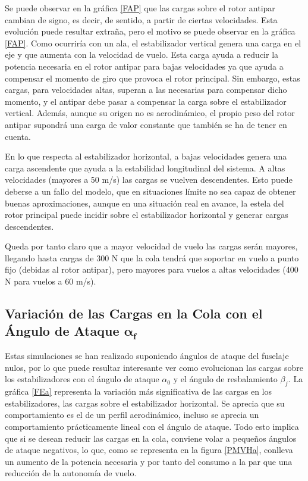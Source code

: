 Se puede observar en la gráfica \ref{FAP} que las cargas sobre el rotor antipar cambian de signo, es decir, de sentido, a partir de ciertas velocidades. Esta evolución puede resultar extraña, pero el motivo se puede observar en la gráfica \ref{FAP}. Como ocurriría con un ala, el estabilizador vertical genera una carga en el eje y que aumenta con la velocidad de vuelo. Esta carga ayuda a reducir la potencia necesaria en el rotor antipar para bajas velocidades ya que ayuda a compensar el momento de giro que provoca el rotor principal. Sin embargo, estas cargas, para velocidades altas, superan a las necesarias para compensar dicho momento, y el antipar debe pasar a compensar la carga sobre el estabilizador vertical. Además, aunque su origen no es aerodinámico, el propio peso del rotor antipar supondrá una carga de valor constante que también se ha de tener en cuenta.

En lo que respecta al estabilizador horizontal, a bajas velocidades genera una carga ascendente que ayuda a la estabilidad longitudinal del sistema. A altas velocidades (mayores a 50 m/s) las cargas se vuelven descendentes. Esto puede deberse a un fallo del modelo, que en situaciones límite no sea capaz de obtener buenas aproximaciones, aunque en una situación real en avance, la estela del rotor principal puede incidir sobre el estabilizador horizontal y generar cargas descendentes.

Queda por tanto claro que a mayor velocidad de vuelo las cargas serán mayores, llegando hasta cargas de 300 N que la cola tendrá que soportar en vuelo a punto fijo (debidas al rotor antipar), pero mayores para vuelos a altas velocidades (400 N para vuelos a 60 m/s).

\subsection{Variación de las Cargas en la Cola con el Ángulo de Ataque $\boldsymbol{\alpha_f}$}

Estas simulaciones se han realizado suponiendo ángulos de ataque del fuselaje nulos, por lo que puede resultar interesante ver como evolucionan las cargas sobre los estabilizadores con el ángulo de ataque $\alpha_0$ y el ángulo de resbalamiento $\beta_f$. La gráfica \ref{FEa} representa la variación más significativa de las cargas en los estabilizadores, las cargas sobre el estabilizador horizontal. Se aprecia que su comportamiento es el de un perfil aerodinámico, incluso se aprecia un comportamiento prácticamente lineal con el ángulo de ataque. Todo esto implica que si se desean reducir las cargas en la cola, conviene volar a pequeños ángulos de ataque negativos, lo que, como se representa en la figura \ref{PMVHa}, conlleva un aumento de la potencia necesaria y por tanto del consumo a la par que una reducción de la autonomía de vuelo.


